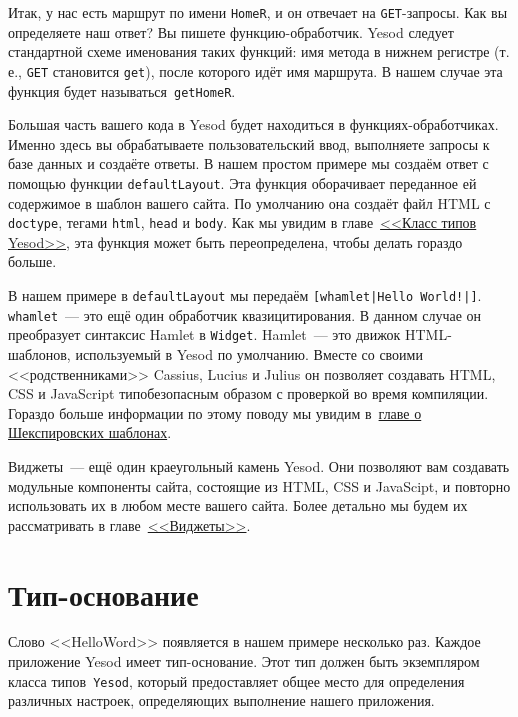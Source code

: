 Итак, у нас есть маршрут по имени \lstinline!HomeR!, и он отвечает на
\texttt{GET}-запросы.  Как вы определяете наш ответ? Вы пишете
функцию-обработчик. Yesod следует стандартной схеме именования таких функций:
имя метода в нижнем регистре (т. е., \texttt{GET} становится \lstinline!get!),
после которого идёт имя маршрута. В нашем случае эта функция будет
называться~\lstinline!getHomeR!.

Большая часть вашего кода в Yesod будет находиться в функциях-обработчиках.
Именно здесь вы обрабатываете пользовательский ввод, выполняете запросы к базе
данных и создаёте ответы. В нашем простом примере мы создаём ответ с помощью
функции \lstinline!defaultLayout!. Эта функция оборачивает переданное ей
содержимое в шаблон вашего сайта. По умолчанию она создаёт файл HTML с
\texttt{doctype}, тегами \texttt{html}, \texttt{head} и \texttt{body}. Как мы
увидим в главе~\hyperref[chap:yesod-typeclass]{<<Класс типов Yesod>>}, эта
функция может быть переопределена, чтобы делать гораздо больше.

В нашем примере в \lstinline!defaultLayout! мы передаём
\lstinline'[whamlet|Hello World!|]'. \lstinline!whamlet!~--- это ещё один
обработчик квазицитирования. В данном случае он преобразует синтаксис Hamlet в
\lstinline{Widget}. Hamlet~--- это движок HTML-шаблонов, используемый в Yesod
по умолчанию.  Вместе со своими <<родственниками>> Cassius, Lucius и Julius он
позволяет создавать HTML, CSS и JavaScript типобезопасным образом с проверкой
во время компиляции. Гораздо больше информации по этому поводу мы увидим
в~\hyperref[chap:shakespeare]{главе о Шекспировских шаблонах}.

Виджеты~--- ещё один краеугольный камень Yesod. Они позволяют вам создавать
модульные компоненты сайта, состоящие из HTML, CSS и JavaScipt, и повторно
использовать их в любом месте вашего сайта. Более детально мы будем их
рассматривать в главе~\hyperref[chap:widgets]{<<Виджеты>>}.

\section{Тип-основание}

Слово <<HelloWord>> появляется в нашем примере несколько раз. Каждое приложение
Yesod имеет тип-основание. Этот тип должен быть экземпляром класса
типов~\lstinline!Yesod!, который предоставляет общее место для определения
различных настроек, определяющих выполнение нашего приложения.

